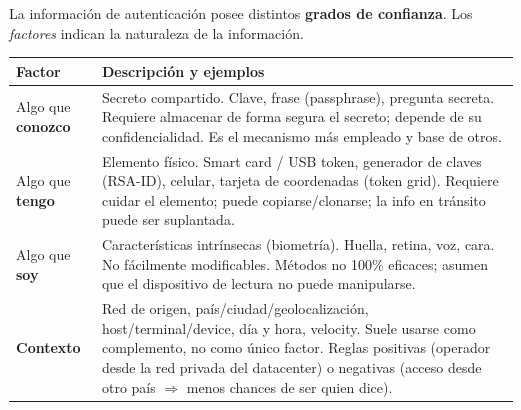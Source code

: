 \documentclass[../main.tex]{subfiles}
\begin{document}
La información de autenticación posee distintos \textbf{grados de confianza}. Los \emph{factores} indican la naturaleza de la información.

\begin{center}
\begin{tabular}{l p{10.5cm}}
\toprule
\textbf{Factor} & \textbf{Descripción y ejemplos} \\
\midrule
Algo que \textbf{conozco} & Secreto compartido. Clave, frase (passphrase), pregunta secreta. Requiere almacenar de forma segura el secreto; depende de su confidencialidad. Es el mecanismo más empleado y base de otros. \\
Algo que \textbf{tengo} & Elemento físico. Smart card / USB token, generador de claves (RSA-ID), celular, tarjeta de coordenadas (token grid). Requiere cuidar el elemento; puede copiarse/clonarse; la info en tránsito puede ser suplantada. \\
Algo que \textbf{soy} & Características intrínsecas (biometría). Huella, retina, voz, cara. No fácilmente modificables. Métodos no 100\% eficaces; asumen que el dispositivo de lectura no puede manipularse. \\
\textbf{Contexto} & Red de origen, país/ciudad/geolocalización, host/terminal/device, día y hora, velocity. Suele usarse como complemento, no como único factor. Reglas positivas (operador desde la red privada del datacenter) o negativas (acceso desde otro país $\Rightarrow$ menos chances de ser quien dice). \\
\bottomrule
\end{tabular}
\end{center}

\begin{center}
\end{center}
\end{document}
